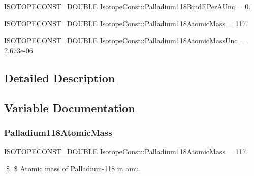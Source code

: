 \begin{DoxyCompactItemize}
\mbox{\hyperlink{group___isotope_const-_macros_ga8f45a7272ce02c0b4c65c44636ed719a}{I\+S\+O\+T\+O\+P\+E\+C\+O\+N\+S\+T\+\_\+\+D\+O\+U\+B\+LE}} \mbox{\hyperlink{group___isotope_const-_palladium-_pd118_ga7fa4114bbb34a341aff2445b7e1b1b67}{Isotope\+Const\+::\+Palladium118\+Bind\+E\+Per\+A\+Unc}} = 0.
\item 
\mbox{\hyperlink{group___isotope_const-_macros_ga8f45a7272ce02c0b4c65c44636ed719a}{I\+S\+O\+T\+O\+P\+E\+C\+O\+N\+S\+T\+\_\+\+D\+O\+U\+B\+LE}} \mbox{\hyperlink{group___isotope_const-_palladium-_pd118_ga502af5e96f899e26983f40614f809b1f}{Isotope\+Const\+::\+Palladium118\+Atomic\+Mass}} = 117.
\item 
\mbox{\hyperlink{group___isotope_const-_macros_ga8f45a7272ce02c0b4c65c44636ed719a}{I\+S\+O\+T\+O\+P\+E\+C\+O\+N\+S\+T\+\_\+\+D\+O\+U\+B\+LE}} \mbox{\hyperlink{group___isotope_const-_palladium-_pd118_ga503cc702c7ea71ecb9d98c334506f5c3}{Isotope\+Const\+::\+Palladium118\+Atomic\+Mass\+Unc}} = 2.\+673e-\/06
\end{DoxyCompactItemize}


\subsection{Detailed Description}


\subsection{Variable Documentation}
\mbox{\label{group___isotope_const-_palladium-_pd118_ga502af5e96f899e26983f40614f809b1f}} 
\subsubsection{\texorpdfstring{Palladium118\+Atomic\+Mass}{Palladium118AtomicMass}}
{\footnotesize\ttfamily \mbox{\hyperlink{group___isotope_const-_macros_ga8f45a7272ce02c0b4c65c44636ed719a}{I\+S\+O\+T\+O\+P\+E\+C\+O\+N\+S\+T\+\_\+\+D\+O\+U\+B\+LE}} Isotope\+Const\+::\+Palladium118\+Atomic\+Mass = 117.}

\$ \$ Atomic mass of Palladium-\/118 in amu. \mbox{\label{group___isotope_const-_palladium-_pd118_ga503cc702c7ea71ecb9d98c334506f5c3}} 

